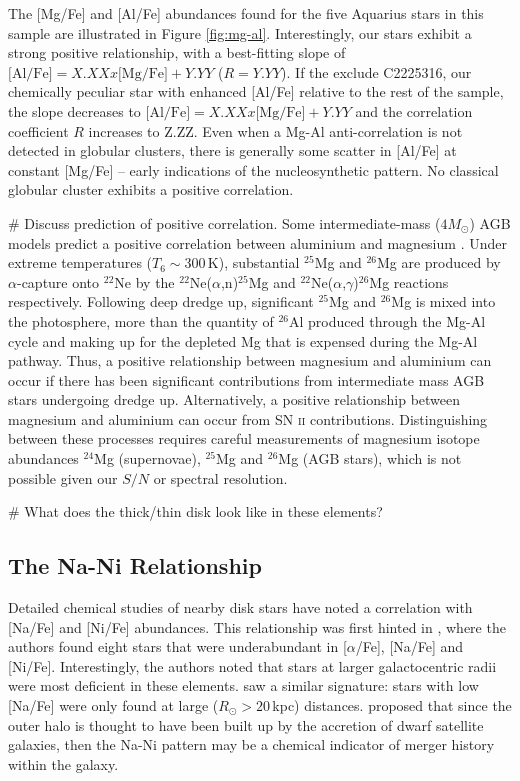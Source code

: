 \documentclass{emulateapj}
\begin{document}
The [Mg/Fe] and [Al/Fe] abundances found for the five Aquarius stars in this sample are illustrated in Figure \ref{fig:mg-al}. Interestingly, our stars exhibit a strong positive relationship, with a best-fitting slope of $\mbox{[Al/Fe]} = X.XX x \mbox{[Mg/Fe]} + Y.YY$ ($R = Y.YY$). If the exclude C2225316, our chemically peculiar star with enhanced [Al/Fe] relative to the rest of the sample, the slope decreases to $\mbox{[Al/Fe]} = X.XX x \mbox{[Mg/Fe]} + Y.YY$ and the correlation coefficient $R$ increases to Z.ZZ. Even when a Mg-Al anti-correlation is not detected in globular clusters, there is generally some scatter in [Al/Fe] at constant [Mg/Fe] \--- early indications of the nucleosynthetic pattern. No classical globular cluster exhibits a positive correlation.

\# Discuss prediction of positive correlation.
Some intermediate-mass ($4M_\odot$) AGB models predict a positive correlation between aluminium and magnesium \citet{karakas;et-al}. Under extreme temperatures ($T_6 \sim 300$\,K), substantial $^{25}$Mg and $^{26}$Mg are produced by $\alpha$-capture onto $^{22}$Ne by the $^{22}$Ne($\alpha$,n)$^{25}$Mg and $^{22}$Ne($\alpha$,$\gamma$)$^{26}$Mg reactions respectively. Following deep dredge up, significant $^{25}$Mg and $^{26}$Mg is mixed into the photosphere, more than the quantity of $^{26}$Al produced through the Mg-Al cycle and making up for the depleted Mg that is expensed during the Mg-Al pathway. Thus, a positive relationship between magnesium and aluminium can occur if there has been significant contributions from intermediate mass AGB stars undergoing dredge up. Alternatively, a positive relationship between magnesium and aluminium can occur from SN \textsc{ii} contributions. Distinguishing between these processes requires careful measurements of magnesium isotope abundances $^{24}$Mg (supernovae), $^{25}$Mg and $^{26}$Mg (AGB stars), which is not possible given our $S/N$ or spectral resolution.

\# What does the thick/thin disk look like in these elements?



\subsection{The Na-Ni Relationship}

Detailed chemical studies of nearby disk stars have noted a correlation with [Na/Fe] and [Ni/Fe] abundances. This relationship was first hinted in \citet{nissen;schuster_1997}, where the authors found eight stars that were underabundant in [$\alpha$/Fe], [Na/Fe] and [Ni/Fe]. Interestingly, the authors noted that stars at larger galactocentric radii were most deficient in these elements. \citet{fulbright_2000} saw a similar signature: stars with low [Na/Fe] were only found at large ($R_\odot > 20$\,kpc) distances. \citet{nissen;schuster_1997} proposed that since the outer halo is thought to have been built up by the accretion of dwarf satellite galaxies, then the Na-Ni pattern may be a chemical indicator of merger history within the galaxy.
\end{document}
